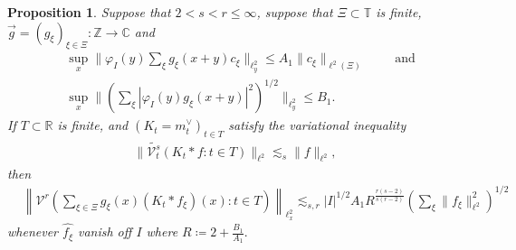 \documentclass[12pt]{amsart}
\numberwithin{equation}{section}
\newtheorem{proposition}[theorem]{Proposition}
\theoremstyle{definition}
\begin{document}
\begin{proposition}\label{p:variable}
Suppose that $2<s<r\leq \infty$, suppose that $\Xi \subset \mathbb{T}$ is finite, $\vec{g} = (g_\xi)_{\xi \in \Xi} : \mathbb{Z} \to \mathbb{C}$ and
\begin{align}
    &\sup_x \| \varphi_I(y) \sum_\xi g_\xi(x+y) c_\xi \|_{\ell^2_y} \leq A_1 \| c_\xi \|_{\ell^2(\Xi)} \qquad \text{ and} \\
    &\sup_x \| (\sum_\xi |\varphi_I(y) g_\xi(x+y)|^2)^{1/2} \|_{\ell^2_y} \leq B_1.
\end{align}
If $T \subset \mathbb{R}$ is finite, and $(K_t = m_t^{\vee})_{t \in T}$ satisfy the variational inequality
\begin{align}
    \| \widetilde{\mathcal{V}^{s}_t}(K_t*f : t \in T) \|_{\ell^2} \lesssim_s \| f \|_{\ell^2},
\end{align}
then
\[\begin{split}
    &\left\| \mathcal{V}^r \left( \sum_{\xi \in \Xi} g_\xi(x) (K_t*f_\xi)(x) : t \in T \right) \right\|_{\ell^2_x} \lesssim_{s,r}   |I|^{1/2} A_1 R^{\frac{r(s-2)}{s(r-2)}}  \left(\sum_{\xi} \|f_\xi\|_{\ell^2}^2\right)^{1/2}
\end{split}\]
whenever $\widehat{f_\xi}$ vanish off $I$ where $R \coloneqq 2+\frac{B_1}{A_1}.$ 
\end{proposition}
\end{document}
